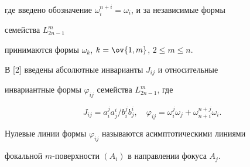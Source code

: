 где введено обозначение $\omega^{n+i}_i=\omega_i$, и за независимые формы 


семейства $L^m_{2n-1}$ 


принимаются формы $\omega_k$, $k=\ov{1,m}$, $2\le m\le n$. 


 


В [2] введены абсолютные инварианты $J_{i j}$ и относительные 


инвариантные формы $\varphi_{i j}$ семейства $L^m_{2n-1}$, где 


$$ 


J_{i j}=a^j_i a^i_j/b^j_i b^i_j,\quad 


\varphi_{i j}=\omega^j_i\omega_j+\omega^{n+j}_{n+i}\omega_i. 


$$ 


Нулевые линии формы $\varphi_{i j}$ называются асимптотическими линиями 


фокальной $m$-поверхности $(A_i)$ в направлении фокуса $A_j$. 


 



